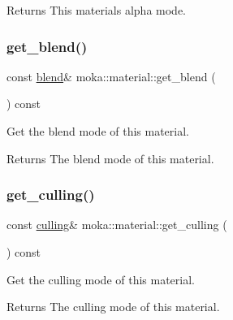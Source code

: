 \begin{DoxyReturn}{Returns}
This material\textquotesingle{}s alpha mode. 
\end{DoxyReturn}
\mbox{\label{classmoka_1_1material_a1d3a936d00273cb2c6692c1c5df03351}} 
\subsubsection{\texorpdfstring{get\_blend()}{get\_blend()}}
{\footnotesize\ttfamily const \mbox{\hyperlink{structmoka_1_1blend}{blend}}\& moka\+::material\+::get\+\_\+blend (\begin{DoxyParamCaption}{ }\end{DoxyParamCaption}) const}



Get the blend mode of this material. 

\begin{DoxyReturn}{Returns}
The blend mode of this material. 
\end{DoxyReturn}
\mbox{\label{classmoka_1_1material_a3eaec73eaa7aa63c4abaeb82dfb9d0c7}} 
\subsubsection{\texorpdfstring{get\_culling()}{get\_culling()}}
{\footnotesize\ttfamily const \mbox{\hyperlink{structmoka_1_1culling}{culling}}\& moka\+::material\+::get\+\_\+culling (\begin{DoxyParamCaption}{ }\end{DoxyParamCaption}) const}



Get the culling mode of this material. 

\begin{DoxyReturn}{Returns}
The culling mode of this material. 
\end{DoxyReturn}
\mbox{\label{classmoka_1_1material_a5eff610e900a4fcac9b9ff1b075e9f08}} 
